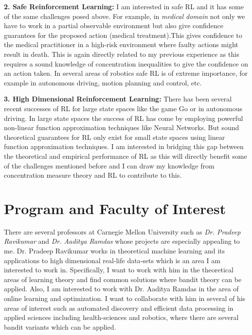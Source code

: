 \documentclass[twoside]{article}
\begin{document}
\textbf{2. Safe Reinforcement Learning:} I am interested in safe RL and it has some of the same challenges posed above. For example, in \textit{medical domain} not only we have to work in a partial observable environment but also give confidence guarantees for the proposed action (medical treatment).This gives confidence to the medical practitioner in a high-risk environment where faulty actions might result in death. This is again directly related to my previous experience as this requires a sound knowledge of concentration inequalities to give the confidence on an action taken. In several areas of robotics safe RL is of extreme importance, for example in autonomous driving, motion planning and control, etc.




\textbf{3. High Dimensional Reinforcement Learning:} There has been several recent successes of RL for large state spaces like the game Go or in autonomous driving. In large state spaces the success of RL has come by employing powerful non-linear function approximation techniques like Neural Networks. But sound theoretical guarantees for RL only exist for small state spaces using linear function approximation techniques. I am interested in bridging this gap between the theoretical and empirical performance of RL as this will directly benefit some of the challenges mentioned before and I can draw my knowledge from concentration measure theory and RL to contribute to this.

\section{Program and Faculty of Interest}

There are several professors at Carnegie Mellon University such as \textit{Dr. Pradeep Ravikumar} and \textit{Dr. Aaditya Ramdas} whose projects are especially appealing to me. Dr. Pradeep Ravikumar works in theoretical machine learning and its applications to high dimensional real-life data-sets which is an area I am interested to work in. Specifically, I want to work with him in the theoretical areas of learning theory and find common solutions where bandit theory can be applied. Also, I am interested to work with Dr. Aaditya Ramdas in the area of online learning and optimization. I want to collaborate with him in several of his areas of interest such as automated discovery and efficient data processing in applied sciences including health-sciences and robotics, where there are several bandit variants which can be applied.
\end{document}

